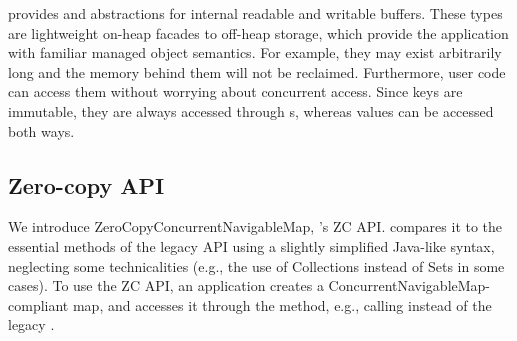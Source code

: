 {\oak\/ provides   and  abstractions for internal readable and writable buffers. 
These types are lightweight on-heap facades to off-heap storage, which provide the application with familiar managed object semantics. 
For example, they may exist arbitrarily long and the memory behind them will not be reclaimed. Furthermore, user code can access 
them without worrying about concurrent access. Since keys are immutable, they are always accessed through s, 
whereas values can be accessed both ways.}

 


\subsection{Zero-copy API}
\label{ssec:API}

We introduce ZeroCopyConcurrentNavigableMap, \oak's ZC API.
   compares it to the essential methods of the %
legacy API using  a slightly simplified Java-like syntax, neglecting some technicalities 
(e.g., the use of Collections instead of Sets in some cases). 
To use the ZC API, an application  creates a ConcurrentNavigableMap-compliant 
\oak\/ map, and accesses 
it through the  method, e.g., calling   instead of the legacy  .
 
